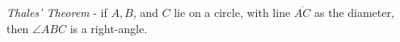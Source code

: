 \documentclass[preview]{standalone}
\begin{document}
\begin{minipage}
\textit{Thales' Theorem} - if $A,B$, and $C$ lie on a circle, with line $\overline{AC}$ as the diameter, then $\angle ABC$ is a right-angle.
\end{minipage}
\end{document}
